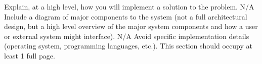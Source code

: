 Explain, at a high level, how you will implement a solution to the problem. 
N/A
Include a diagram of major components to the system (not a full architectural design, 
but a high level overview of the major system components and how a user or external system might interface). 
N/A
Avoid specific implementation details (operating system, programming languages, etc.). 
This section should occupy at least 1 full page.